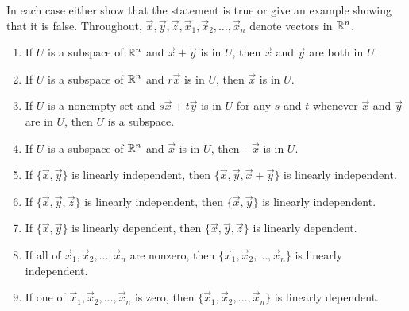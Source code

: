 \documentclass{ximera}
\begin{document}
\begin{problem}\label{prob:5.5challenge}
In each case either show that the statement is true or give an example showing that it is false. Throughout, $\vec{x}, \vec{y}, \vec{z}, \vec{x}_{1}, \vec{x}_{2}, \dots, \vec{x}_{n}$ denote vectors in $\mathbb{R}^n$.

\begin{enumerate}
\item If $U$ is a subspace of $\mathbb{R}^n$ and $\vec{x} + \vec{y}$ is in $U$, then $\vec{x}$ and $\vec{y}$ are both in $U$.

\item If $U$ is a subspace of $\mathbb{R}^n$ and $r\vec{x}$ is in $U$, then $\vec{x}$ is in $U$.

\item If $U$ is a nonempty set and $s\vec{x} + t\vec{y}$ is in $U$ for any $s$ and $t$ whenever $\vec{x}$ and $\vec{y}$ are in $U$, then $U$ is a subspace.

\item If $U$ is a subspace of $\mathbb{R}^n$ and $\vec{x}$ is in $U$, then $-\vec{x}$ is in $U$.

\item If $\{\vec{x}, \vec{y}\}$ is linearly independent, then $\{\vec{x}, \vec{y}, \vec{x} + \vec{y}\}$ is linearly independent.

\item If $\{\vec{x}, \vec{y}, \vec{z}\}$ is linearly independent, then $\{\vec{x}, \vec{y}\}$ is linearly independent.

\item If $\{\vec{x}, \vec{y}\}$ is linearly dependent, then $\{\vec{x}, \vec{y}, \vec{z}\}$ is linearly dependent.

\item If all of $\vec{x}_{1}, \vec{x}_{2}, \dots, \vec{x}_{n}$ are nonzero, then $\{\vec{x}_{1}, \vec{x}_{2}, \dots, \vec{x}_{n}\}$ is linearly independent.

\item If one of $\vec{x}_{1}, \vec{x}_{2}, \dots, \vec{x}_{n}$ is zero, then $\{\vec{x}_{1}, \vec{x}_{2}, \dots, \vec{x}_{n}\}$ is linearly dependent.


\end{enumerate}
\end{problem}
\end{document}
